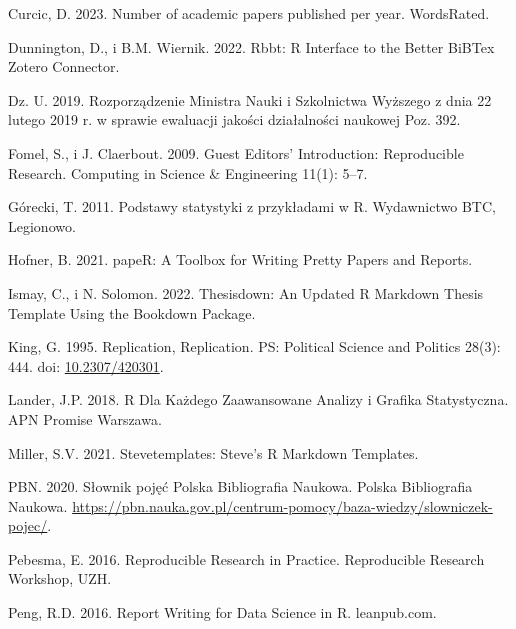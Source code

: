 \documentclass[
  12pt,
]{article}
\newlength{\cslhangindent}
\newlength{\cslentryspacingunit} %
\newenvironment{CSLReferences}[2] %
 {%
  \setlength{\parindent}{0pt}
  \ifodd #1
  \let\oldpar\par
  \def\par{\hangindent=\cslhangindent\oldpar}
  \fi
  \setlength{\parskip}{#2\cslentryspacingunit}
 }%
 {}
\begin{document}
\begin{CSLReferences}{1}{0}
\leavevmode{}%
Curcic, D. 2023. Number of academic papers published per year.
WordsRated.

\leavevmode{}%
Dunnington, D., i B.M. Wiernik. 2022. Rbbt: {R} Interface to the Better
{BiBTex} Zotero Connector.

\leavevmode{}%
Dz. U. 2019. Rozporz{ą}dzenie Ministra Nauki i Szkolnictwa Wy{ż}szego z
dnia 22 lutego 2019 r. w sprawie ewaluacji jako{ś}ci dzia{ł}alno{ś}ci
naukowej Poz. 392.

\leavevmode{}%
Fomel, S., i J. Claerbout. 2009. Guest Editors' Introduction:
{Reproducible} Research. Computing in Science \& Engineering 11(1):
5--7.

\leavevmode{}%
Górecki, T. 2011. Podstawy statystyki z przyk{ł}adami w R. Wydawnictwo
BTC, Legionowo.

\leavevmode{}%
Hofner, B. 2021. {papeR}: {A} Toolbox for Writing Pretty Papers and
Reports.

\leavevmode{}%
Ismay, C., i N. Solomon. 2022. Thesisdown: {An} Updated {R Markdown}
Thesis Template Using the Bookdown Package.

\leavevmode{}%
King, G. 1995. Replication, {Replication}. PS: Political Science and
Politics 28(3): 444. doi:
\href{https://doi.org/10.2307/420301}{10.2307/420301}.

\leavevmode{}%
Lander, J.P. 2018. R Dla Każdego {Zaawansowane} Analizy i Grafika
Statystyczna. {APN Promise Warszawa}.

\leavevmode{}%
Miller, S.V. 2021. Stevetemplates: {Steve}'s {R} Markdown Templates.

\leavevmode{}%
PBN. 2020. Słownik pojęć Polska Bibliografia Naukowa. Polska
Bibliografia Naukowa.
\url{https://pbn.nauka.gov.pl/centrum-pomocy/baza-wiedzy/slowniczek-pojec/}.

\leavevmode{}%
Pebesma, E. 2016. Reproducible Research in Practice. Reproducible
Research Workshop, UZH.

\leavevmode{}%
Peng, R.D. 2016. Report Writing for Data Science in {R}. {leanpub.com}.


\end{CSLReferences}
\end{document}
